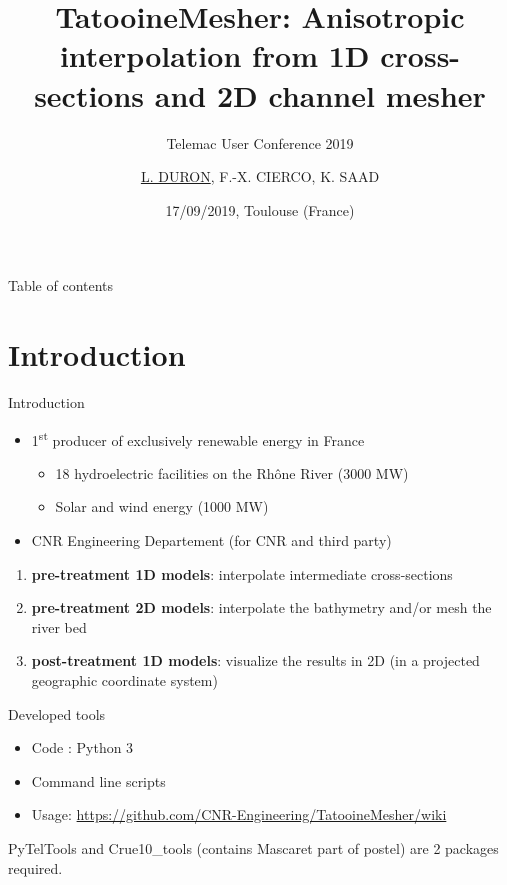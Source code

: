 \documentclass[10pt]{beamer}
\title{TatooineMesher: Anisotropic interpolation from 1D cross-sections and 2D channel mesher}
\subtitle{Telemac User Conference 2019}
\date{17/09/2019, Toulouse (France)}
\author{\underline{L. DURON}, F.-X. CIERCO, K. SAAD}
\begin{document}
\maketitle


\begin{frame}{Table of contents}
  \tableofcontents
\end{frame}


\section{Introduction}

\begin{frame}{Introduction}

\begin{itemize}
    \item 1\textsuperscript{st} producer of exclusively renewable energy in France
    \begin{itemize}
        \item 18 hydroelectric facilities on the Rhône River (3000 MW)
        \item Solar and wind energy (1000 MW)
    \end{itemize}
    \item CNR Engineering Departement (for CNR and third party)
\end{itemize}

\pause

\begin{enumerate}
    \item \textbf{pre-treatment 1D models}: interpolate intermediate
cross-sections
    \item \textbf{pre-treatment 2D models}: interpolate the bathymetry
and/or mesh the river bed
    \item \textbf{post-treatment 1D models}: visualize the results in 2D (in a projected geographic coordinate system)
\end{enumerate}

\end{frame}


\begin{frame}{Developed tools}

\begin{itemize}
    \item Code : Python 3
    \item Command line scripts
    \item Usage: \url{https://github.com/CNR-Engineering/TatooineMesher/wiki}
\end{itemize}

\vspace{0.2cm}
\pause


{\centering

}

PyTelTools and Crue10\_tools (contains Mascaret part of postel) are 2 packages required.

\end{frame}
\end{document}
